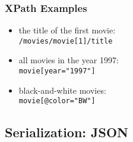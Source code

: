 \documentclass[dvipsnames]{beamer}
\theoremstyle{plain}
\begin{document}
\begin{frame}
  \frametitle{XPath Examples}

  \begin{example}
    \begin{itemize}
      \item the title of the first movie:\\
        \lstinline!/movies/movie[1]/title!

      \pause
      \item all movies in the year 1997:\\
        \lstinline!movie[year="1997"]!

      \pause
      \item black-and-white movies:\\
        \lstinline!movie[@color="BW"]!
    \end{itemize}
  \end{example}
\end{frame}

\subsection{Serialization: JSON}
\end{document}
